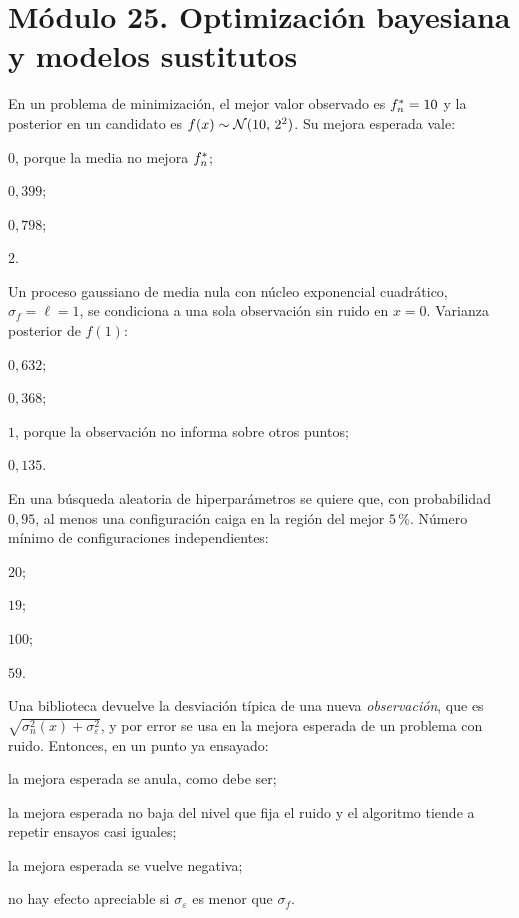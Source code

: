 \section*{Módulo 25. Optimización bayesiana y modelos sustitutos}

\begin{cuestiones}[resume]
\item {} En un problema de minimización, el mejor valor observado es $f^{\ast}_{n}=10$ y la posterior en un candidato es $f(x)\sim\mathcal{N}(10,\,2^{2})$. Su mejora esperada vale:
\begin{opciones}
  \item $0$, porque la media no mejora $f^{\ast}_{n}$;
  \item $0{,}399$;
  \item $0{,}798$;
  \item $2$.
\end{opciones}

\item {} Un proceso gaussiano de media nula con núcleo exponencial cuadrático, $\sigma_f=\ell=1$, se condiciona a una sola observación sin ruido en $x=0$. Varianza posterior de $f(1)$:
\begin{opciones}
  \item $0{,}632$;
  \item $0{,}368$;
  \item $1$, porque la observación no informa sobre otros puntos;
  \item $0{,}135$.
\end{opciones}

\item {} En una búsqueda aleatoria de hiperparámetros se quiere que, con probabilidad $0{,}95$, al menos una configuración caiga en la región del mejor $5\,\%$. Número mínimo de configuraciones independientes:
\begin{opciones}
  \item $20$;
  \item $19$;
  \item $100$;
  \item $59$.
\end{opciones}

\item {} Una biblioteca devuelve la desviación típica de una nueva \emph{observación}, que es $\sqrt{\sigma_n^{2}(x)+\sigma_\varepsilon^{2}}$, y por error se usa en la mejora esperada de un problema con ruido. Entonces, en un punto ya ensayado:
\begin{opciones}
  \item la mejora esperada se anula, como debe ser;
  \item la mejora esperada no baja del nivel que fija el ruido y el algoritmo tiende a repetir ensayos casi iguales;
  \item la mejora esperada se vuelve negativa;
  \item no hay efecto apreciable si $\sigma_\varepsilon$ es menor que $\sigma_f$.
\end{opciones}
\end{cuestiones}

